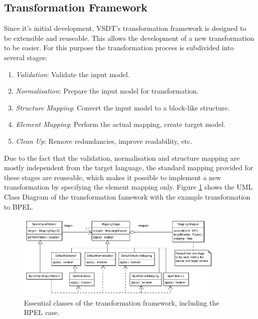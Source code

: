 \subsection{Transformation Framework}
Since it's initial development, VSDT's transformation framework is designed to be extensible and reuseable. This allows the development of a new transformation to be easier. For this purpose the transformation process is subdivided into several stages: 
\begin{enumerate}
	\item \textit{Validation}: Validate the input model.
	\item \textit{Normalisation}: Prepare the input model for transformation.
	\item \textit{Structure Mapping}: Convert the input model to a block-like structure.
	\item \textit{Element Mapping}: Perform the actual mapping, create target model.
	\item \textit{Clean Up}: Remove redundancies, improve readability, etc.
\end{enumerate}

Due to the fact that the validation, normalisation and structure mapping are mostly independent from the target language, the standard mapping provided for these stages are reuseable, which makes it possible to implement a new transformation by specifying the element mapping only. Figure \ref{fig:transform} shows the UML Class Diagram of the transformation famework with the example transformation to BPEL.
\begin{figure}[h]
	\centering
		\includegraphics[width=0.90\textwidth]{images/transformation.png}
	\caption{Essential classes of the transformation framework, including the BPEL case.\cite{TK07}}
	\label{fig:transform}
\end{figure}\\

\newpage

